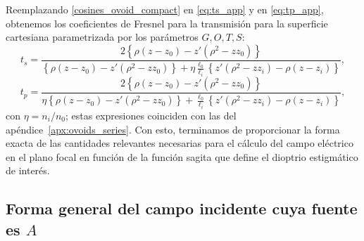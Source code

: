 Reemplazando \eqref{cosines_ovoid_compact} en \eqref{eq:ts_app} y en \eqref{eq:tp_app}, obtenemos los coeficientes de Fresnel para la transmisión para la superficie cartesiana parametrizada por los parámetros $G,O,T,S$:
\begin{equation}
 t_s
 =
 \frac{
 2 \left\{ \rho(z - z_0) - z'(\rho^2 - zz_0) \right\}
 }
 {
 \left\{ \rho(z - z_0) - z'(\rho^2 - zz_0) \right\}
 +
 \eta \frac{\ell_0}{\ell_i}
 \left\{ z'(\rho^2 - zz_i) - \rho(z - z_i) \right\}
 },
  \label{eq:t_s_ovoid}
\end{equation}
\begin{equation}
 t_p
 =
 \frac{
 2 \left\{ \rho(z - z_0) - z'(\rho^2 - zz_0) \right\}
 }
 {
 \eta
 \left\{ \rho(z - z_0) - z'(\rho^2 - zz_0) \right\}
 +
 \frac{\ell_0}{\ell_i}
 \left\{ z'(\rho^2 - zz_i) - \rho(z - z_i) \right\}
 },
  \label{eq:t_p_ovoid}
\end{equation}
con $\eta=n_i/n_0$; estas expresiones coinciden con las del apéndice~\ref{apx:ovoids_series}.
Con esto, terminamos de proporcionar la forma exacta de las cantidades relevantes necesarias para el cálculo del campo eléctrico en el plano focal en función de la función sagita que define el dioptrio estigmático de interés.

\subsection{Forma general del campo incidente cuya fuente es $A$}
\label{subsec:campo_incidente_fuente_A}

